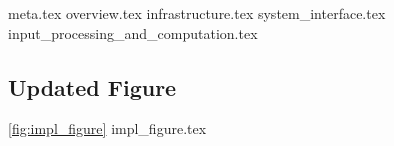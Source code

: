{meta.tex}
{overview.tex}
{infrastructure.tex}
{system_interface.tex}
{input_processing_and_computation.tex}

\subsection{Updated Figure}
\cref{fig:impl_figure}
{impl_figure.tex}
